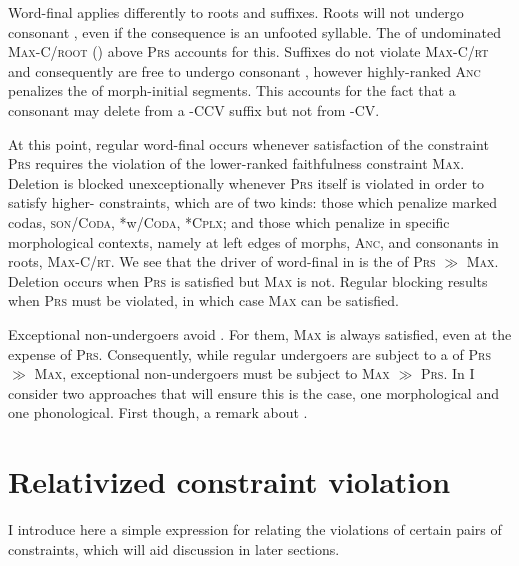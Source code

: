 \documentclass[output=paper,
modfonts
]{LSP/langsci}
\begin{document}
Word-final  applies differently to roots and suffixes. Roots will not undergo consonant , even if the consequence is an unfooted syllable. The  of undominated \textsc{Max-C/root} (\citealt{mccarthy1995r}) above \textsc{Prs} accounts for this. Suffixes do not violate \textsc{Max-C/rt} and consequently are free to undergo consonant , however highly-ranked \textsc{Anc} penalizes the  of morph-initial segments. This accounts for the fact that a consonant may delete from a -CCV suffix but not from -CV.

At this point, regular word-final  occurs whenever satisfaction of the  constraint \textsc{Prs} requires the violation of the lower-ranked faithfulness constraint \textsc{Max}. Deletion is blocked unexceptionally whenever \textsc{Prs} itself is violated in order to satisfy higher- constraints, which are of two kinds: those which penalize marked codas, \textsc{son/Coda}, *w\textsc{/Coda,} *\textsc{Cplx}; and those which penalize  in specific morphological contexts, namely at left edges of morphs, \textsc{Anc}, and consonants in roots, \textsc{Max-C/rt}. We see that the driver of word-final  in  is the  of \textsc{Prs} ${\gg}$ \textsc{Max.} Deletion occurs when \textsc{Prs} is satisfied but \textsc{Max} is not. Regular blocking results when \textsc{Prs} must be violated, in which case \textsc{Max} can be satisfied.

Exceptional non-undergoers avoid . For them, \textsc{Max} is always satisfied, even at the expense of \textsc{Prs}. Consequently, while regular undergoers are subject to a   of \textsc{Prs} ${\gg}$ \textsc{Max,} exceptional non-undergoers must be subject to \textsc{Max} ${\gg}$ \textsc{Prs.} In  I consider two approaches that will ensure this is the case, one morphological and one phonological. First though, a remark about .

\section[Relativized constraint violation]{Relativized constraint violation}\label{sec:round:3}

I introduce here a simple expression for relating the violations of certain pairs of constraints, which will aid discussion in later sections.
\end{document}
